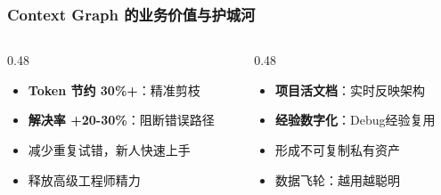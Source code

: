 \documentclass[aspectratio=169,10pt]{beamer}
\begin{document}
\begin{frame}
  \frametitle{Context Graph 的业务价值与护城河}

  \begin{columns}[T]
    \begin{column}{0.48\textwidth}
      \begin{tcolorbox}[colback=layer1, title=\textbf{降本增效}]
        \footnotesize
        \begin{itemize}
          \item \textbf{Token 节约 30\%+}：精准剪枝
          \item \textbf{解决率 +20-30\%}：阻断错误路径
          \item 减少重复试错，新人快速上手
          \item 释放高级工程师精力
        \end{itemize}
      \end{tcolorbox}
    \end{column}

    \begin{column}{0.48\textwidth}
      \begin{tcolorbox}[colback=layer2, title=\textbf{资产沉淀}]
        \footnotesize
        \begin{itemize}
          \item \textbf{项目活文档}：实时反映架构
          \item \textbf{经验数字化}：Debug经验复用
          \item 形成\textcolor{dotred}{不可复制私有资产}
          \item 数据飞轮：越用越聪明
        \end{itemize}
      \end{tcolorbox}
    \end{column}
  \end{columns}
\end{frame}
\end{document}
